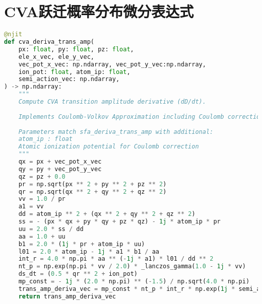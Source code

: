 \section{CVA跃迁概率分布微分表达式}\label{app:cva_trans_amp}
\begin{lstlisting}[language=Python, caption={CVA跃迁概率分布微分表达式}, label={code:cva-trans-amp}]
@njit
def cva_deriva_trans_amp(
	px: float, py: float, pz: float,
	ele_x_vec, ele_y_vec,
	vec_pot_x_vec: np.ndarray, vec_pot_y_vec:np.ndarray,
	ion_pot: float, atom_ip: float,
	semi_action_vec: np.ndarray,
) -> np.ndarray:
    """
	Compute CVA transition amplitude derivative (dD/dt).
	
	Implements Coulomb-Volkov Approximation including Coulomb corrections.
	
	Parameters match sfa_deriva_trans_amp with additional:
	atom_ip : float
	Atomic ionization potential for Coulomb correction
	"""
	qx = px + vec_pot_x_vec
	qy = py + vec_pot_y_vec
	qz = pz + 0.0
	pr = np.sqrt(px ** 2 + py ** 2 + pz ** 2)
	qr = np.sqrt(qx ** 2 + qy ** 2 + qz ** 2)
	vv = 1.0 / pr
	a1 = vv
	dd = atom_ip ** 2 + (qx ** 2 + qy ** 2 + qz ** 2)
	ss = - (px * qx + py * qy + pz * qz) - 1j * atom_ip * pr
	uu = 2.0 * ss / dd
	aa = 1.0 + uu
	b1 = 2.0 * (1j * pr + atom_ip * uu)
	l01 = 2.0 * atom_ip - 1j * a1 * b1 / aa
	int_r = 4.0 * np.pi * aa ** (-1j * a1) * l01 / dd ** 2
	nt_p = np.exp(np.pi * vv / 2.0) * _lanczos_gamma(1.0 - 1j * vv)
	ds_dt = (0.5 * qr ** 2 + ion_pot)
	mp_const = - 1j * (2.0 * np.pi) ** (-1.5) / np.sqrt(4.0 * np.pi)
	trans_amp_deriva_vec = mp_const * nt_p * int_r * np.exp(1j * semi_action_vec) * ds_dt
	return trans_amp_deriva_vec
\end{lstlisting}


